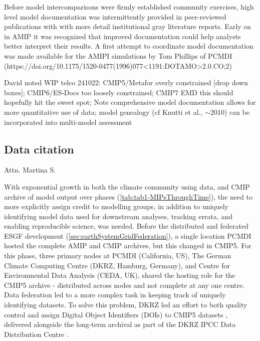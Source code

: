\documentclass[gmd, preprint]{copernicus}
\def\cred#1{{\color{red}#1}}
\begin{document}
Before model intercomparisons were firmly established community exercises, high level model documentation was intermittently  provided in peer-reviewed publications with with more detail institutional gray literature reports.  Early on in AMIP it was recognized that improved documentation could help analysts better interpret their results.  A first attempt to coordinate model documentation was made available for the AMIPI simulations by Tom Phillips of PCMDI 
(https://doi.org/10.1175/1520-0477(1996)077<1191:DOTAMO>2.0.CO;2)

\cred{David noted WIP telco 241022: CMIP5/Metafor \citep{guilyardi_cmip5_2011} overly constrained [drop down boxes]; CMIP6/ES-Docs \citep{pascoe_documenting_2020} too loosely constrained; CMIP7 EMD this should hopefully hit the sweet spot; Note comprehensive model documentation allows for more quantitative use of data; model genealogy (cf Knutti et al., ${\sim}$2010) can be incorporated into multi-model assessment}


\subsection{Data citation}
\label{sec:DataCitation}
\cred{Attn. Martina S.}

With exponential growth in both the climate community using data, and CMIP archive of model output over phases (\autoref{tab:tab1-MIPsThroughTime}), the need to more explicitly assign credit to modelling groups, in addition to uniquely identifying model data used for downstream analyses, tracking errata, and enabling reproducible science, was needed. Before the distributed and federated ESGF development (\autoref{sec:earthSystemGridFederation}), a single location PCMDI hosted the complete AMIP and CMIP archives, but this changed in CMIP5. For this phase, three primary nodes at PCMDI (California, US), The German Climate Computing Centre (DKRZ, Hamburg, Germany), and Centre for Environmental Data Analysis (CEDA, UK), shared the hosting role for the CMIP5 archive - distributed across nodes and not complete at any one centre. Data federation led to a more complex task in keeping track of uniquely identifying datasets. To solve this problem, DKRZ led an effort to both quality control and assign Digital Object Identifiers (DOIs) to CMIP5 datasets \citep{stockhause_quality_2012, stockhause_cmip6_2017}, delivered alongside the long-term archival as part of the DKRZ IPCC Data Distribution Centre \citep[IPCC DDC;][]{stockhause_twenty-five_2022}.
\end{document}
